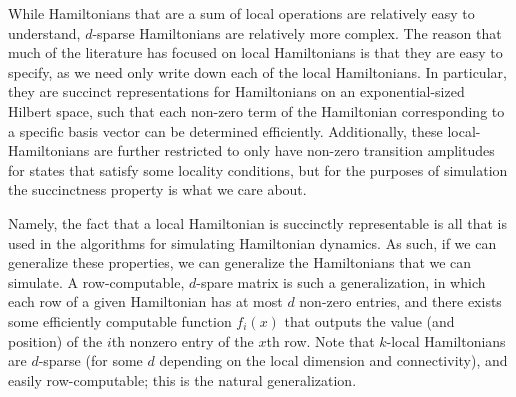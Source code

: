 \documentclass[../thesis-main/thesis-main]{subfiles}
\begin{document}
While Hamiltonians that are a sum of local operations are relatively easy to understand, $d$-sparse Hamiltonians are relatively more complex.  The reason that much of the literature has focused on local Hamiltonians is that they are easy to specify, as we need only write down each of the local Hamiltonians.  In particular, they are succinct representations for Hamiltonians on an exponential-sized Hilbert space, such that each non-zero term of the Hamiltonian corresponding to a specific basis vector can be determined efficiently.  Additionally, these local-Hamiltonians are further restricted to only have non-zero transition amplitudes for states that satisfy some locality conditions, but for the purposes of simulation the succinctness property is what we care about.

Namely, the fact that a local Hamiltonian is succinctly representable is all that is used in the algorithms for simulating Hamiltonian dynamics.  As such, if we can generalize these properties, we can generalize the Hamiltonians that we can simulate.  A row-computable, $d$-spare matrix is such a generalization, in which each row of a given Hamiltonian has at most $d$ non-zero entries, and there exists some efficiently computable function $f_{i}(x)$ that outputs the value (and position) of the $i$th nonzero entry of the $x$th row.  Note that $k$-local Hamiltonians are $d$-sparse (for some $d$ depending on the local dimension and connectivity), and easily row-computable; this is the natural generalization.
\end{document}
